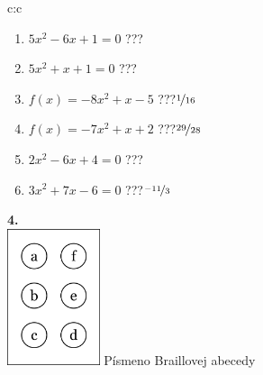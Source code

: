 \documentclass[10pt]{report}
\begin{document}
\begin{tabular}{c:c}
\begin{minipage}[c][104.5mm][t]{0.5\linewidth}
\begin{center}
\begin{minipage}{0.79\linewidth}
\begin{center}
\begin{varwidth}{\linewidth}
\begin{enumerate}
\Large
\item $5x^2-6x+1=0$\quad \dotfill\; ???\;\dotfill {}
\item $5x^2+x+1=0$\quad \dotfill\; ???\;\dotfill {}
\item $f(x)=-8x^2+x-5$\quad \dotfill\; ???\;\dotfill \quad $\nicefrac{1}{16}$
\item $f(x)=-7x^2+x+2$\quad \dotfill\; ???\;\dotfill \quad $\nicefrac{29}{28}$
\item $2x^2-6x+4=0$\quad \dotfill\; ???\;\dotfill {}
\item $3x^2+7x-6=0$\quad \dotfill\; ???\;\dotfill \quad $\nicefrac{-11}{3}$
\end{enumerate}
\end{varwidth}
\end{center}
\end{minipage}
\begin{minipage}{0.20\linewidth}
\begin{center}
{\Huge\bfseries 4.} \\[2mm]
\includegraphics[height=40mm]{../images/braille.png}
{\small Písmeno Braillovej abecedy}
\end{center}
\end{minipage}
\end{center}
\end{minipage}
%
\end{tabular}
\newpage
\thispagestyle{empty}
\end{document}
